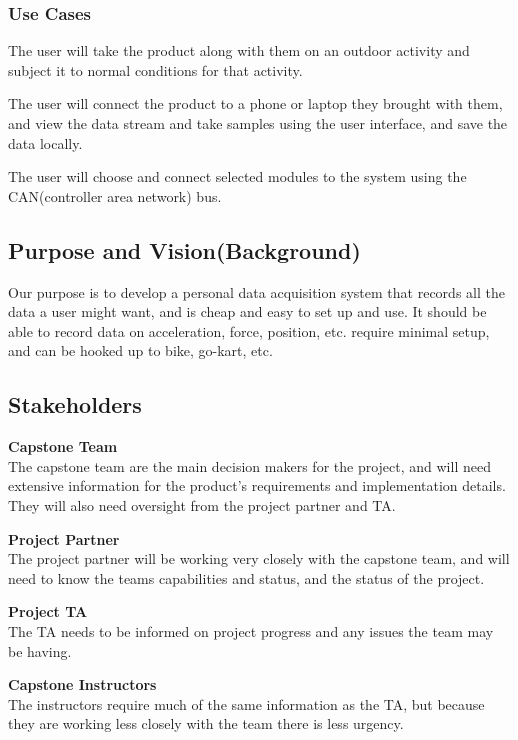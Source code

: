 \documentclass{article}
\begin{document}
\subsubsection{Use Cases}
\label{use-cases}

The user will take the product along with them on an outdoor activity
and subject it to normal conditions for that activity.

The user will connect the product to a phone or laptop they brought with
them, and view the data stream and take samples using the user
interface, and save the data locally.

The user will choose and connect selected modules to the system using
the CAN(controller area network) bus.


\subsection{Purpose and Vision(Background)}
\label{purpose-and-visionbackground}

Our purpose is to develop a personal data acquisition system that
records all the data a user might want, and is cheap and easy to set up
and use. It should be able to record data on acceleration, force,
position, etc. require minimal setup, and can be hooked up to bike,
go-kart, etc.


\subsection{Stakeholders}
\label{stakeholders}

\textbf{Capstone Team}\\
The capstone team are the main decision makers for the project, and will
need extensive information for the product's requirements and
implementation details. They will also need oversight from the project
partner and TA.

\textbf{Project Partner}\\
The project partner will be working very closely with the capstone team,
and will need to know the teams capabilities and status, and the status
of the project.

\textbf{Project TA}\\
The TA needs to be informed on project progress and any issues the team
may be having.

\textbf{Capstone Instructors}\\
The instructors require much of the same information as the TA, but
because they are working less closely with the team there is less
urgency.
\end{document}
